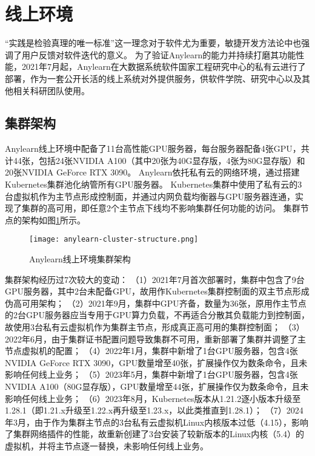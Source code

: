 \section{线上环境}

“实践是检验真理的唯一标准”这一理念对于软件尤为重要，敏捷开发方法论中也强调了用户反馈对软件迭代的意义。
为了验证Anylearn的能力并持续打磨其功能性能，2021年7月起，Anylearn在大数据系统软件国家工程研究中心的私有云进行了部署，作为一套公开长活的线上系统对外提供服务，供软件学院、研究中心以及其他相关科研团队使用。

\subsection{集群架构}
Anylearn线上环境中配备了11台高性能GPU服务器，每台服务器配备4张GPU，共计44张，包括24张NVIDIA A100（其中20张为40G显存版，4张为80G显存版）和20张NVIDIA GeForce RTX 3090。
Anylearn依托私有云的网络环境，通过搭建Kubernetes集群池化纳管所有GPU服务器。
Kubernetes集群中使用了私有云的3台虚拟机作为主节点形成控制面，并通过内网负载均衡器与GPU服务器连通，实现了集群的高可用，即任意2个主节点下线均不影响集群任何功能的访问。
集群节点的架构如图\ref{fig:cluster}所示。

\begin{figure}
  \centering
  \texttt{[image: anylearn-cluster-structure.png]}
  \caption{Anylearn线上环境集群架构}
  \label{fig:cluster}
\end{figure}

集群架构经历过7次较大的变动：
（1）2021年7月首次部署时，集群中包含了9台GPU服务器，其中2台未配备GPU，故用作Kubernetes集群控制面的双主节点形成伪高可用架构；
（2）2021年9月，集群中GPU齐备，数量为36张，原用作主节点的2台GPU服务器应当专用于GPU算力负载，不再适合分散其负载能力到控制面，故使用3台私有云虚拟机作为集群主节点，形成真正高可用的集群控制面； 
（3）2022年6月，由于集群证书配置问题导致集群不可用，重新部署了集群并调整了主节点虚拟机的配置；
（4）2022年1月，集群中新增了1台GPU服务器，包含4张NVIDIA GeForce RTX 3090，GPU数量增至40张，扩展操作仅为数条命令，且未影响任何线上业务；
（5）2023年5月，集群中新增了1台GPU服务器，包含4张NVIDIA A100（80G显存版），GPU数量增至44张，扩展操作仅为数条命令，且未影响任何线上业务；
（6）2023年8月，Kubernetes版本从1.21.2逐小版本升级至1.28.1（即1.21.x升级至1.22.x再升级至1.23.x，以此类推直到1.28.1）；
（7）2024年3月，由于作为集群主节点的3台私有云虚拟机Linux内核版本过低（4.15），影响了集群网络插件的性能，故重新创建了3台安装了较新版本的Linux内核（5.4）的虚拟机，并将主节点逐一替换，未影响任何线上业务。

